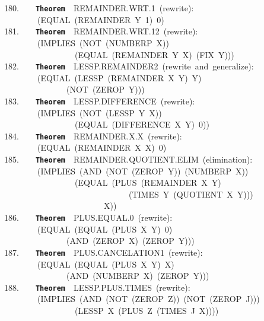 \documentclass[11pt]{book}
\newenvironment{pubasis}{\begin{flushleft}\ttfamily\small}{\normalsize\rmfamily\end{flushleft}}
\newcommand{\axiomordefinition}[1]{\vspace{6pt}\texttt{\textbf{#1}}}
\begin{document}
\begin{pubasis}
180.~~~~\axiomordefinition{Theorem}~~REMAINDER.WRT.1~(rewrite):\\
~~~~~~~~(EQUAL~(REMAINDER~Y~1)~0)\\

181.~~~~\axiomordefinition{Theorem}~~REMAINDER.WRT.12~(rewrite):\\
~~~~~~~~(IMPLIES~(NOT~(NUMBERP~X))\\
~~~~~~~~~~~~~~~~~(EQUAL~(REMAINDER~Y~X)~(FIX~Y)))\\

182.~~~~\axiomordefinition{Theorem}~~LESSP.REMAINDER2~(rewrite~and~generalize):\\
~~~~~~~~(EQUAL~(LESSP~(REMAINDER~X~Y)~Y)\\
~~~~~~~~~~~~~~~(NOT~(ZEROP~Y)))\\

183.~~~~\axiomordefinition{Theorem}~~LESSP.DIF\-FER\-ENCE~(rewrite):\\
~~~~~~~~(IMPLIES~(NOT~(LESSP~Y~X))\\
~~~~~~~~~~~~~~~~~(EQUAL~(DIFFERENCE~X~Y)~0))\\

184.~~~~\axiomordefinition{Theorem}~~REMAINDER.X.X~(rewrite):\\
~~~~~~~~(EQUAL~(REMAINDER~X~X)~0)\\

185.~~~~\axiomordefinition{Theorem}~~REMAINDER.QUOTIENT.ELIM~(elimination):\\
~~~~~~~~(IMPLIES~(AND~(NOT~(ZEROP~Y))~(NUMBERP~X))\\
~~~~~~~~~~~~~~~~~(EQUAL~(PLUS~(REMAINDER~X~Y)\\
~~~~~~~~~~~~~~~~~~~~~~~~~~~~~~(TIMES~Y~(QUOTIENT~X~Y)))\\
~~~~~~~~~~~~~~~~~~~~~~~~X))\\

186.~~~~\axiomordefinition{Theorem}~~PLUS.EQUAL.0~(rewrite):\\
~~~~~~~~(EQUAL~(EQUAL~(PLUS~X~Y)~0)\\
~~~~~~~~~~~~~~~(AND~(ZEROP~X)~(ZEROP~Y)))\\

187.~~~~\axiomordefinition{Theorem}~~PLUS.CANCELATION1~(rewrite):\\
~~~~~~~~(EQUAL~(EQUAL~(PLUS~X~Y)~X)\\
~~~~~~~~~~~~~~~(AND~(NUMBERP~X)~(ZEROP~Y)))\\

188.~~~~\axiomordefinition{Theorem}~~LESSP.PLUS.TIMES~(rewrite):\\
~~~~~~~~(IMPLIES~(AND~(NOT~(ZEROP~Z))~(NOT~(ZEROP~J)))\\
~~~~~~~~~~~~~~~~~(LESSP~X~(PLUS~Z~(TIMES~J~X))))\\


\end{pubasis}
\end{document}
